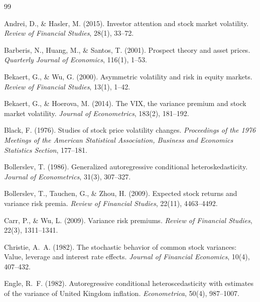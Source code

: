 \documentclass[12pt,a4paper]{article}
\begin{document}

\begin{thebibliography}{99}

Andrei, D., \& Hasler, M. (2015). Investor attention and stock market volatility. \textit{Review of Financial Studies}, 28(1), 33--72.

Barberis, N., Huang, M., \& Santos, T. (2001). Prospect theory and asset prices. \textit{Quarterly Journal of Economics}, 116(1), 1--53.

Bekaert, G., \& Wu, G. (2000). Asymmetric volatility and risk in equity markets. \textit{Review of Financial Studies}, 13(1), 1--42.

Bekaert, G., \& Hoerova, M. (2014). The VIX, the variance premium and stock market volatility. \textit{Journal of Econometrics}, 183(2), 181--192.

Black, F. (1976). Studies of stock price volatility changes. \textit{Proceedings of the 1976 Meetings of the American Statistical Association, Business and Economics Statistics Section}, 177--181.

Bollerslev, T. (1986). Generalized autoregressive conditional heteroskedasticity. \textit{Journal of Econometrics}, 31(3), 307--327.

Bollerslev, T., Tauchen, G., \& Zhou, H. (2009). Expected stock returns and variance risk premia. \textit{Review of Financial Studies}, 22(11), 4463--4492.

Carr, P., \& Wu, L. (2009). Variance risk premiums. \textit{Review of Financial Studies}, 22(3), 1311--1341.

Christie, A.~A. (1982). The stochastic behavior of common stock variances: Value, leverage and interest rate effects. \textit{Journal of Financial Economics}, 10(4), 407--432.

Engle, R.~F. (1982). Autoregressive conditional heteroscedasticity with estimates of the variance of United Kingdom inflation. \textit{Econometrica}, 50(4), 987--1007.


\end{thebibliography}
\end{document}
